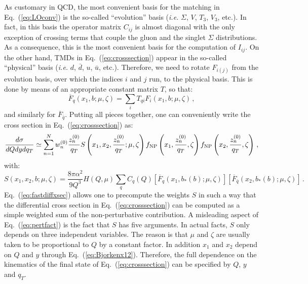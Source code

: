 \documentclass[10pt,a4paper]{article}
\begin{document}
As customary in QCD, the most convenient basis for the matching in
Eq.~(\ref{eq:LOconv}) is the so-called ``evolution'' basis
(\textit{i.e.} $\Sigma$, $V$, $T_3$, $V_3$, etc.). In fact, in this
basis the operator matrix $C_{ij}$ is almost diagonal with the only
exception of crossing terms that couple the gluon and the singlet
$\Sigma$ distributions. As a consequence, this is the most convenient
basis for the computation of $I_{ij}$. On the other hand, TMDs in
Eq.~(\ref{eq:crosssection}) appear in the so-called ``physical'' basis
(\textit{i.e.} $d$, $\bar{d}$, $u$, $\bar{u}$, etc.). Therefore, we
need to rotate $F_{i(j)}$ from the evolution basis, over which the
indices $i$ and $j$ run, to the physical basis. This is done by means
of an appropriate constant matrix $T$, so that:
\begin{equation}\label{eq:lumiInterRot}
\overline{F}_{q}(x_1,b;\mu,\zeta)= \sum_{i}T_{qi}F_{i}(x_1,b;\mu,\zeta)\,,
\end{equation}
and similarly for $\overline{F}_{\bar{q}}$. Putting all pieces
together, one can conveniently write the cross section in
Eq.~(\ref{eq:crosssection}) as:
\begin{equation}\label{eq:fastdiffxsec}
  \frac{d\sigma}{dQ dy dq_T} \simeq\sum_{n=1}^N w_n^{(0)} \frac{z_n^{(0)}}{q_T}S\left(x_1,x_2,\frac{z_n^{(0)}}{q_T};\mu,\zeta\right) f_{\rm NP}\left(x_1,\frac{z_n^{(0)}}{q_T},\zeta\right) f_{\rm NP}\left(x_2,\frac{z_n^{(0)}}{q_T},\zeta\right)\,,
\end{equation}
with:
\begin{equation}\label{eq:pertfact}
S(x_1,x_2,b;\mu,\zeta) =\frac{8\pi\alpha^2}{9 Q^3}
    H(Q,\mu) \sum_q C_q(Q) \left[
\overline{F}_q\left(x_1,b_*(b);\mu,\zeta \right)\right] \left[
\overline{F}_{\bar{q}}\left(x_2,b_*(b);\mu,\zeta \right)\right]\,.
\end{equation}
Eq.~(\ref{eq:fastdiffxsec}) allows one to precompute the weights $S$
in such a way that the differential cross section in
Eq.~(\ref{eq:crosssection}) can be computed as a simple weighted sum
of the non-perturbative contribution. A misleading aspect of
Eq.~(\ref{eq:pertfact}) is the fact that $S$ has five arguments. In
actual facts, $S$ only depends on three independent variables. The
reason is that $\mu$ and $\zeta$ are usually taken to be proportional
to $Q$ by a constant factor. In addition $x_1$ and $x_2$ depend on $Q$
and $y$ through Eq.~(\ref{eq:Bjorkenx12}). Therefore, the full
dependence on the kinematics of the final state of
Eq.~(\ref{eq:crosssection}) can be specified by $Q$, $y$ and $q_T$.
\end{document}
